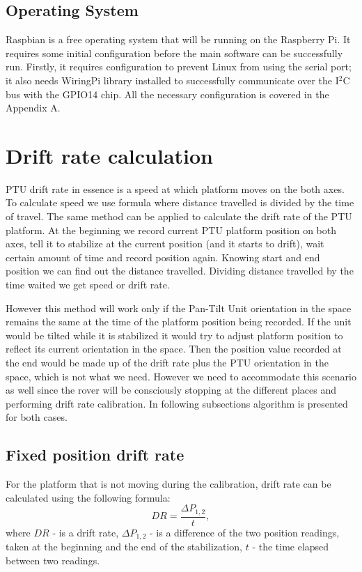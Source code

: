 \subsection{Operating System}
Raspbian is a free operating system that will be running on the Raspberry Pi. It requires some initial configuration before the main software can be successfully run. Firstly, it requires configuration to prevent Linux from using the serial port; it also needs WiringPi library \cite{WiringPi} installed to successfully communicate over the I$^2$C bus with the GPIO14 chip. All the necessary configuration is covered in the Appendix A. 

\section{Drift rate calculation}
PTU drift rate in essence is a speed at which platform moves on the both axes. To calculate speed we use formula where distance travelled is divided by the time of travel. The same method can be applied to calculate the drift rate of the PTU platform. At the beginning we record current PTU platform position on both axes, tell it to stabilize at the current position (and it starts to drift), wait certain amount of time and record position again. Knowing start and end position we can find out the distance travelled. Dividing distance travelled by the time waited we get speed or drift rate. 

However this method will work only if the Pan-Tilt Unit orientation in the space remains the same at the time of the platform position being recorded. If the unit would be tilted while it is stabilized it would try to adjust platform position to reflect its current orientation in the space. Then the position value recorded at the end would be made up of the drift rate plus the PTU orientation in the space, which is not what we need. However we need to accommodate this scenario as well since the rover will be consciously stopping at the different places and performing drift rate calibration. In following subsections algorithm is presented for both cases. 

\subsection{Fixed position drift rate}
For the platform that is not moving during the calibration, drift rate can be calculated using the following formula:
\[DR = \frac {\Delta P_{1,2}}{t},\] where $DR$ - is a drift rate, $\Delta P_{1,2}$ - is a difference of the two position readings, taken at the beginning and the end of the stabilization, $t$ - the time elapsed between two readings.    
    
